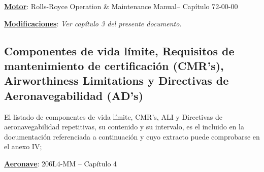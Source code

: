 \documentclass[
]{article}
\begin{document}
\textbf{\ul{Motor}}: Rolls-Royce Operation \& Maintenance Manual--
Capítulo 72-00-00

\textbf{\ul{Modificaciones}}: \emph{Ver capítulo 3 del presente
documento.}

\hypertarget{componentes-de-vida-luxedmite-requisitos-de-mantenimiento-de-certificaciuxf3n-cmrs-airworthiness-limitations-y-directivas-de-aeronavegabilidad-ads}{%
\subsection{Componentes de vida límite, Requisitos de mantenimiento de
certificación (CMR's), Airworthiness Limitations y Directivas de
Aeronavegabilidad
(AD's)}\label{componentes-de-vida-luxedmite-requisitos-de-mantenimiento-de-certificaciuxf3n-cmrs-airworthiness-limitations-y-directivas-de-aeronavegabilidad-ads}}

El listado de componentes de vida límite, CMR's, ALI y Directivas de
aeronavegabilidad repetitivas, su contenido y su intervalo, es el
incluido en la documentación referenciada a continuación y cuyo extracto
puede comprobarse en el anexo IV;

\textbf{\ul{Aeronave}}: 206L4-MM -- Capítulo 4
\end{document}
